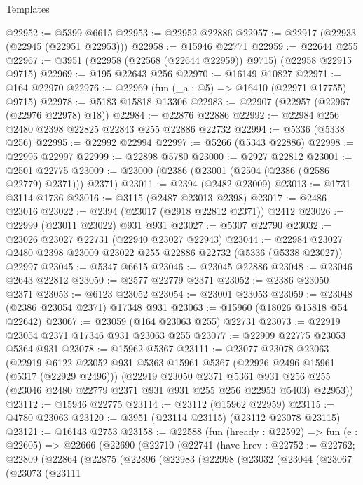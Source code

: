 \begin{lexlean}{Templates}
\begin{coremodule}
@22952 := @5399 @6615
@22953 := @22952 @22886
@22957 := @22917 (@22933 (@22945 (@22951 @22953)))
@22958 := @15946 @22771
@22959 := @22644 @255
@22967 := @3951 (@22958 (@22568 (@22644 @22959)) @9715) (@22958 @22915 @9715)
@22969 := @195 @22643 @256
@22970 := @16149 @10827
@22971 := @164 @22970
@22976 := @22969 (fun (_a : @5) => @16410 (@22971 @17755) @9715)
@22978 := @5183 @15818 @13306
@22983 := @22907 (@22957 (@22967 (@22976 @22978) @18))
@22984 := @22876 @22886
@22992 := @22984 @256 @2480 @2398 @22825 @22843 @255 @22886 @22732
@22994 := @5336 (@5338 @256)
@22995 := @22992 @22994
@22997 := @5266 (@5343 @22886)
@22998 := @22995 @22997
@22999 := @22898 @5780
@23000 := @2927 @22812
@23001 := @2501 @22775
@23009 := @23000 (@2386 (@23001 (@2504 (@2386 (@2586 @22779) @2371))) @2371)
@23011 := @2394 (@2482 @23009)
@23013 := @1731 @3114 @1736
@23016 := @3115 (@2487 @23013 @2398)
@23017 := @2486 @23016
@23022 := @2394 (@23017 (@2918 @22812 @2371)) @2412
@23026 := @22999 (@23011 @23022) @931 @931
@23027 := @5307 @22790
@23032 := @23026 @23027 @22731 (@22940 @23027 @22943)
@23044 := @22984 @23027 @2480 @2398 @23009 @23022 @255 @22886 @22732 (@5336 (@5338 @23027)) @22997
@23045 := @5347 @6615
@23046 := @23045 @22886
@23048 := @23046 @2643 @22812
@23050 := @2577 @22779 @2371
@23052 := @2386 @23050 @2371
@23053 := @6123 @23052
@23054 := @23001 @23053
@23059 := @23048 (@2386 @23054 @2371) @17348 @931
@23063 := @15960 (@18026 @15818 @54 @22642)
@23067 := @23059 (@164 @23063 @255) @22731
@23073 := @22919 @23054 @2371 @17346 @931 @23063 @255
@23077 := @22909 @22775 @23053 @5364 @931
@23078 := @15962 @5367
@23111 := @23077
    @23078
    @23063
    (@22919
      @6122
      @23052
      @931
      @5363
      @15961
      @5367
      (@22926 @2496 @15961 (@5317 (@22929 @2496)))
      (@22919
        @23050
        @2371
        @5361
        @931
        @256
        @255
        (@23046 @2480 @22779 @2371 @931 @931 @255 @256 @22953 @5403)
        @22953))
@23112 := @15946 @22775
@23114 := @23112 (@15962 @22959)
@23115 := @4780 @23063
@23120 := @3951 (@23114 @23115) (@23112 @23078 @23115)
@23121 := @16143 @2753
@23158 := @22588
    (fun (hready : @22592) =>
    fun (e : @22605) =>
    @22666
      (@22690
        (@22710
          (@22741
            (have hrev : @22752 := @22762;
            @22809
              (@22864
                (@22875
                  (@22896
                    (@22983
                      (@22998
                        (@23032
                          (@23044
                            (@23067
                              (@23073
                                (@23111

\end{coremodule}
\end{lexlean}
